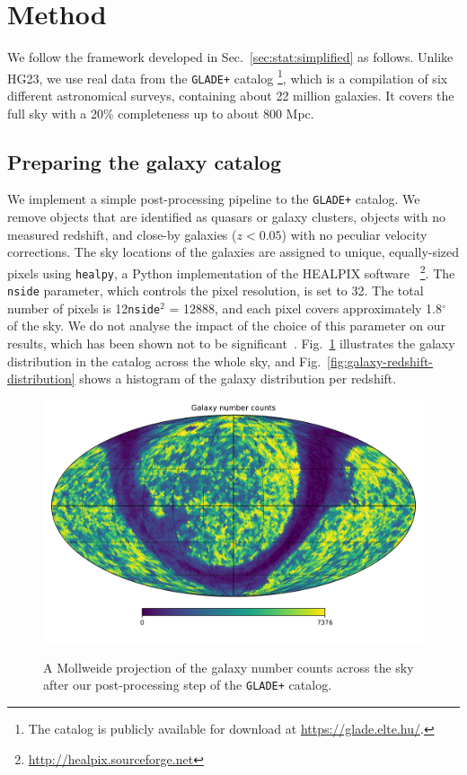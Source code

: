 \documentclass[%
preprint,
nofootinbib,
 amsmath,amssymb,
 aps,
]{revtex4-2}
\begin{document}
\section{Method}
\label{sec:method}

We follow the framework developed in Sec.~\ref{sec:stat:simplified} as follows. Unlike HG23, we use
real data from the \texttt{GLADE+} catalog \cite{D_lya_2018,D_lya_2022} \footnote{The catalog is
	publicly available for download at \url{https://glade.elte.hu/}.}, which is a compilation of six
different astronomical surveys, containing about 22 million galaxies. It covers the full sky with a
20\% completeness up to about 800 Mpc.

\subsection{Preparing the galaxy catalog}

We implement a simple post-processing pipeline to the \texttt{GLADE+} catalog. We remove objects
that are identified as quasars or galaxy clusters, objects with no measured redshift, and close-by
galaxies ($z<0.05$) with no peculiar velocity corrections. The sky locations of the galaxies are
assigned to unique, equally-sized pixels using \texttt{healpy}, a Python implementation of the
HEALPIX software~\cite{2005ApJ...622..759G,Zonca2019}
\footnote{\url{http://healpix.sourceforge.net}}. The \texttt{nside} parameter, which controls the
pixel resolution, is set to 32. The total number of pixels is 12\texttt{nside}$^2$ = 12888, and
each pixel covers approximately 1.8$^{\circ}$ of the sky. We do not analyse the impact of the
choice of this parameter on our results, which has been shown not to be
significant~\cite{Gray_2022}. Fig.~\ref{fig:galaxy-map} illustrates the galaxy distribution in the
catalog across the whole sky, and Fig.~\ref{fig:galaxy-redshift-distribution} shows a histogram of
the galaxy distribution per redshift.

\begin{figure}[!ht]
	\caption{A Mollweide projection of the galaxy number counts across the sky after our post-processing step of the \texttt{GLADE+} catalog.}
	\centering
	\includegraphics[width=\textwidth]{../src/figures/galaxy-map.png}
	\label{fig:galaxy-map}
\end{figure}
\end{document}
